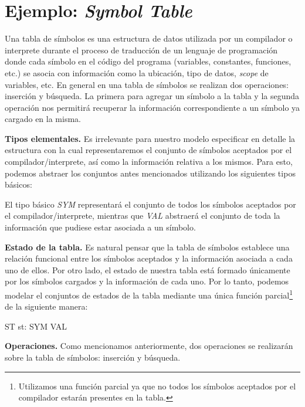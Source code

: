 \section{Ejemplo: \emph{Symbol Table}}
\label{sec:ej-symbolTable}

Una tabla de símbolos es una estructura de datos utilizada por un compilador o interprete durante el proceso de traducción de un lenguaje de programación donde cada símbolo en el código del programa (variables, constantes, funciones, etc.) se asocia con información como la ubicación, tipo de datos, \textit{scope} de variables, etc. 
En general en una tabla de símbolos se realizan dos operaciones: inserción y búsqueda. La primera para agregar un símbolo a la tabla y la segunda operación nos permitirá recuperar la información correspondiente a un símbolo ya cargado en la misma.


\bigskip
\noindent
\textbf{Tipos elementales.} Es irrelevante para nuestro modelo especificar en detalle la estructura con la cual representaremos el conjunto de símbolos aceptados por el compilador/interprete, así como la información relativa a los mismos. Para esto, podemos abstraer los conjuntos antes mencionados utilizando los siguientes tipos básicos: 

\begin{zed}
\end{zed}

El tipo básico \emph{SYM} representará el conjunto de todos los símbolos aceptados por el compilador/interprete, mientras que \emph{VAL} abstraerá el conjunto de toda la información que pudiese estar asociada a un símbolo.
 
\bigskip
\noindent
\textbf{Estado de la tabla.} Es natural pensar que la tabla de símbolos establece una relación funcional entre los símbolos aceptados y la información asociada a cada uno de ellos. Por otro lado, el estado de nuestra tabla está formado únicamente por los símbolos cargados y la información de cada uno. Por lo tanto, podemos modelar el conjuntos de estados de la tabla mediante una única función parcial\footnote{Utilizamos una función parcial ya que no todos los símbolos aceptados por el compilador estarán presentes en la tabla.} de la siguiente manera:

\begin{schema}{ST}
st: SYM \pfun VAL
\end{schema}

\bigskip
\noindent
\textbf{Operaciones.} Como mencionamos anteriormente, dos operaciones se realizarán sobre la tabla de símbolos: inserción y búsqueda.

